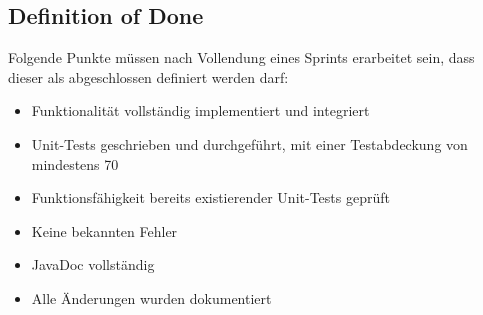 \subsection{Definition of Done}
Folgende Punkte müssen nach Vollendung eines Sprints erarbeitet sein, dass dieser als abgeschlossen definiert werden darf:
\begin{itemize}
	\item Funktionalität vollständig implementiert und integriert
	\item Unit-Tests geschrieben und durchgeführt, mit einer Testabdeckung von mindestens 70%
	\item
Funktionsfähigkeit bereits existierender Unit-Tests geprüft
	\item Keine bekannten Fehler
	\item JavaDoc vollständig
	\item Alle Änderungen wurden dokumentiert
\end{itemize}